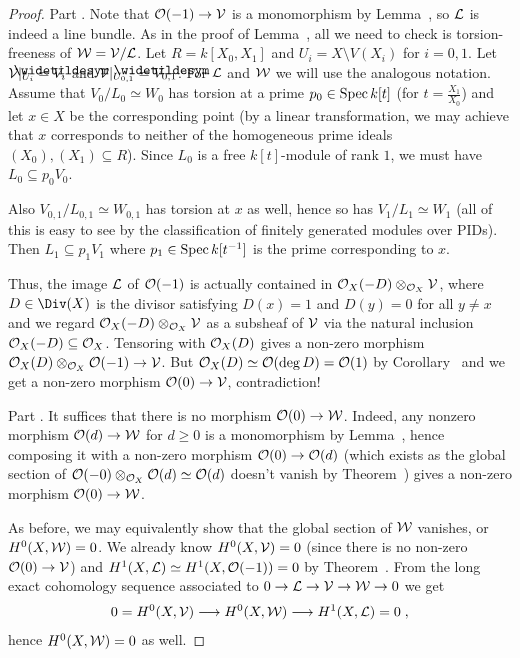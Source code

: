 \documentclass[a4paper,parskip=half,numbers=enddot, DIV=12]{scrreprt}
\begin{document}
\begin{proof}
	Part . Note that $\Oo(-1)\morphism\Vv$ is a monomorphism by Lemma~, so $\mathcal{L}$ is indeed a line bundle. As in the proof of Lemma~, all we need to check is torsion-freeness of $\mathcal{W}=\mathcal{V}/\mathcal{L}$. Let $R=k[X_0,X_1]$ and $U_i=X\setminus V(X_i)$ for $i=0,1$. Let $\Vv|_{U_i}=\snake{V}_i$ and $\Vv|_{U_{0,1}}=\snake{V}_{0,1}$. For $\mathcal{L}$ and $\mathcal{W}$ we will use the analogous notation. Assume that $V_0/L_0\simeq W_0$ has torsion at a prime $p_0\in\operatorname{Spec} k[t]$ (for $t=\frac{X_1}{X_0}$) and let $x\in X$ be the corresponding point (by a linear transformation, we may achieve that $x$ corresponds to neither of the homogeneous prime ideals $(X_0),(X_1)\subseteq R$). Since $L_0$ is a free $k[t]$-module of rank $1$, we must have $L_0\subseteq p_0V_0$. 
	
	Also $V_{0,1}/L_{0,1}\simeq W_{0,1}$ has torsion at $x$ as well, hence so has $V_1/L_1\simeq W_1$ (all of this is easy to see by the classification of finitely generated modules over PIDs). Then $L_1\subseteq p_1V_1$ where $p_1\in\operatorname{Spec} k[t^{-1}]$ is the prime corresponding to $x$.
	
	Thus, the image $\mathcal{L}$ of $\mathcal{O}(-1)$ is actually contained in $\mathcal{O}_X(-D)\otimes_{\mathcal{O}_X}\mathcal{V}$, where $D\in\Div(X)$ is the divisor satisfying $D(x)=1$ and $D(y)=0$ for all $y\neq x$ and we regard $\mathcal{O}_X(-D)\otimes_{\mathcal{O}_X}\mathcal{V}$ as a subsheaf of $\mathcal{V}$ via the natural inclusion $\mathcal{O}_X(-D)\subseteq \mathcal{O}_X$. Tensoring with $\mathcal{O}_X(D)$ gives a non-zero morphism $\Oo_X(D)\otimes_{\Oo_X}\Oo(-1)\morphism\Vv$. But $\mathcal{O}_X(D)\simeq \mathcal{O}(\deg D)=\mathcal{O}(1)$ by Corollary~ and we get a non-zero morphism $\Oo(0)\morphism\Vv$, contradiction!
	
	Part . It suffices that there is no morphism $\Oo(0)\morphism\Ww$. Indeed, any nonzero morphism $\Oo(d)\morphism\Ww$ for $d\geq 0$ is a monomorphism by Lemma~, hence composing it with a non-zero morphism $\Oo(0)\morphism\Oo(d)$ (which exists as the global section of $\mathcal{O}(-0)\otimes_{\mathcal{O}_X}\mathcal{O}(d)\simeq \mathcal{O}(d)$ doesn't vanish by Theorem~) gives a non-zero morphism $\Oo(0)\morphism\Ww$. 
	
	As before, we may equivalently show that the global section of $\mathcal{W}$ vanishes, or $H^0(X,\mathcal{W})=0$. We already know $H^0(X,\mathcal{V})=0$ (since there is no non-zero $\Oo(0)\morphism\Vv$) and $H^1(X,\mathcal{L})\simeq H^1(X,\mathcal{O}(-1))=0$ by Theorem~. From the long exact cohomology sequence associated to $0\morphism \Ll\morphism\Vv\morphism\Ww\morphism 0$ we get
	\begin{align*}
		0=H^0(X,\Vv)\morphism H^0(X,\Ww)\morphism H^1(X,\Ll)=0\;,
	\end{align*}
	hence $H^0(X,\mathcal{W})=0$ as well.
\end{proof}
\end{document}
